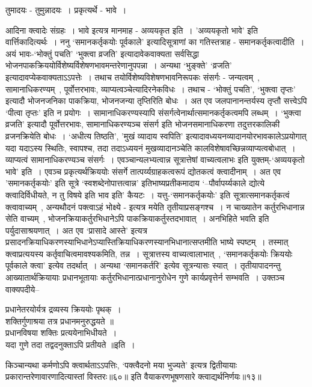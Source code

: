 {{{{ तुमादयः - तुमुन्नादयः~।
प्रकृत्यर्थे - भावे~।

 आदिना क्त्वादेः संग्रहः~।
भावे इत्यत्र मानमाह - अव्ययकृत इति~।
'अव्ययकृतो भावे' इति वार्त्तिकादित्यर्थः~।
ननु `समानकर्तृकयोः पूर्वकाले' इत्यादिसूत्राणां का गतिस्तत्राह - समानकर्तृकत्वादीति~।
अयं भावः-`भोक्तुं पचति' `भुक्त्वा व्रजति' इत्यादावेकवाक्यता सर्वसिद्धा भोजनपाकक्रिययोर्विशेष्यर्विशेषणभावमन्तरेणानुपपन्ना~।
अन्यथा `भुङ्क्ते' `व्रजति' इत्यादावप्येकवाक्यताऽऽपत्तेः~।
तथाच तयोर्विशेष्यविशेषणभावनिरूपकः संसर्गः - जन्यत्वम्~, सामानाधिकरण्यम्~, पूर्वोत्तरभावः, व्याप्यत्वञ्चेत्यादिरनेकविधः~।
तथाच - `भोक्तुं पचति', `भुक्त्वा तृप्तः' इत्यादौ भोजनजनिका पाकक्रिया, भोजनजन्या तृप्तिरिति बोधः~।
अत एव जलपानानन्तर्यस्य तृप्तौ सत्त्वेऽपि `पीत्वा तृप्तः' इति न प्रयोगः~।
सामानाधिकरण्यस्यापि संसर्गत्वेनार्थात्समानकर्तृकत्वमपि लब्धम्~।
`भुक्त्वा व्रजति' इत्यादौ पूर्वोत्तरभावः, सामानाधिकरण्यञ्च संसर्ग इति भोजनसमानाधिकरणा तदुत्तरकालिकी व्रजनक्रियेति बोधः~।
`अधीत्य तिष्ठति', 'मुखं व्यादाय स्वपिति' इत्यादावध्ययनव्यादानयोरभावकालेऽप्रयोगात् यदा यदाऽस्य स्थितिः, स्वापश्च, तदा तदाऽध्ययनं मुखव्यादानञ्चेति कालविशेषावच्छिन्नव्याप्यत्वबोधात्~।
व्याप्यत्वं सामानाधिकरण्यञ्च संसर्गः~।
 एवञ्चान्यलभ्यत्वान्न सूत्रात्तेषां वाच्यत्वलाभः इति युक्तम्-`अव्ययकृतो भावे' इति~।
एवञ्च प्रकृत्यर्थक्रिययोः संसर्गे तात्पर्य्यग्राहकत्वरूपं द्योतकत्वं क्त्वादीनाम्~।
अत एव 'समानकर्तृकयोः' इति सूत्रे `स्वशब्देनोपात्तत्वान्न' इतिभाष्यप्रतीकमादाय `--पौर्वापर्य्यकाले द्योत्ये क्त्वादिर्विधीयते, न तु विषये इति भाव इति' कैयटः~।
 यत्तु-`समानकर्तृकयोः' इति सूत्रात्समानकर्तृकत्वं क्त्वावाच्यम्~, अन्यथौदनं पक्त्वाऽहं भोक्ष्ये - इत्यत्र मयेति तृतीयाप्रसङ्गश्च~।
न चाख्यातेन कर्तुरभिधानान्न सेति वाच्यम्~, भोजनक्रियाकर्तुरभिधानेऽपि पाकक्रियाकर्तुस्तदभावात्~।
 अनभिहिते भवति इति पर्युदासाश्रयणात्~।
अत एव `प्रासादे आस्ते' इत्यत्र प्रसादनक्रियाधिकरणस्याभिधानेऽप्यास्तिक्रियाधिकरणस्यानभिधानात्सप्तमीति भाष्ये स्पष्टम्~।
तस्मात् क्त्वाप्रत्ययस्य कर्तृवाचित्वमावश्यकमिति, तन्न~।
सूत्रात्तस्य वाच्यत्वालाभात्~, `समानकर्तृकयोः क्रिययोः पूर्वकाले क्त्वा' इत्येव तदर्थात्~।
अन्यथा `समानकर्तरि' इत्येव सूत्रन्यासः स्यात्~।
तृतीयापादनन्तु आख्यातार्थक्रियायाः प्रधानभूतायाः कर्तुरभिधानात्प्रधानानुरोधेन गुणे कार्यप्रवृत्तेर्न सम्भवति~।
उक्तञ्च वाक्यपदीये--
\begin{center} प्रधानेतरयोर्यत्र द्रव्यस्य क्रिययोः पृथक्~।\\
 शक्तिर्गुणाश्रया तत्र प्रधानमनुरुद्धयते ॥\\[10pt]
 प्रधानविषया शक्तिः प्रत्ययेनाभिधीयते~।\\
यदा गुणे तदा तद्वदनुक्ताऽपि प्रतीयते ॥इति~।\end{center}
 किञ्चान्यथा कर्मणोऽपि क्त्वार्थताऽऽपत्तिः, `पक्त्वैदनो मया भुज्यते' इत्यत्र द्वितीयायाः प्रकारान्तरेणावारणादित्यास्तां विस्तरः॥६०॥
 इति वैयाकरणभूषणसारे क्त्वाद्यर्थनिर्णयः॥१३॥

}}}}
